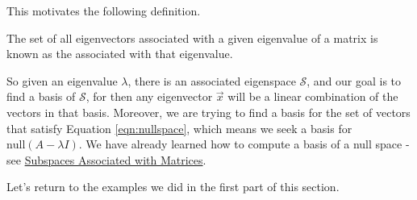 \documentclass{ximera}
\begin{document}
This motivates the following definition.

\begin{definition}\label{def:eigspace}
The set of all eigenvectors associated with a given eigenvalue of a matrix is known as the  associated with that eigenvalue.
\end{definition}

So given an eigenvalue $\lambda$, there is an associated eigenspace $\mathcal{S}$, and our goal is to find a basis of $\mathcal{S}$, for then any eigenvector $\vec{x}$ will be a linear combination of the vectors in that basis.  Moreover, we are trying to find a basis for the set of vectors that satisfy Equation \ref{eqn:nullspace}, which means we seek a basis for $\mbox{null}(A-\lambda I)$.  We have already learned how to compute a basis of a null space - see \href{https://ximera.osu.edu/oerlinalg/LinearAlgebra/VSP-0040/main}{Subspaces Associated with Matrices}.

Let's return to the examples we did in the first part of this section.
\end{document}
